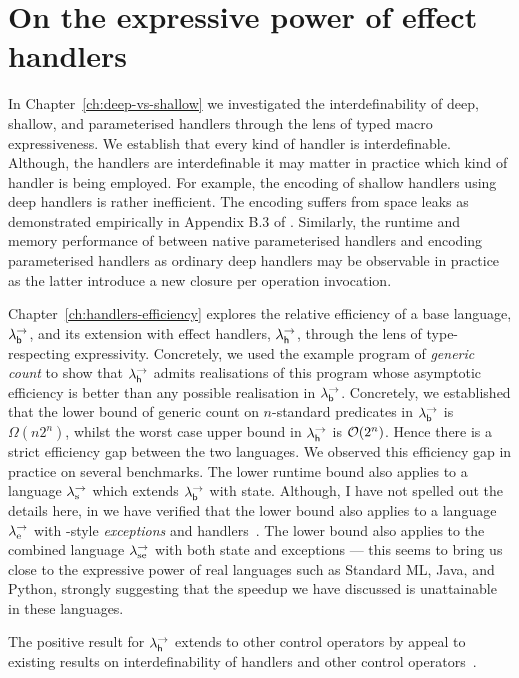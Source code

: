 \documentclass[12pt,phd,lfcs,twoside,openright,logo,leftchapter,normalheadings]{infthesis}
\theoremstyle{plain}
\theoremstyle{definition}
\begin{document}
\section{On the expressive power of effect handlers}

In Chapter~\ref{ch:deep-vs-shallow} we investigated the
interdefinability of deep, shallow, and parameterised handlers through
the lens of typed macro expressiveness. We establish that every kind
of handler is interdefinable. Although, the handlers are
interdefinable it may matter in practice which kind of handler is
being employed. For example, the encoding of shallow handlers using
deep handlers is rather inefficient. The encoding suffers from space
leaks as demonstrated empirically in Appendix B.3 of
\citet{HillerstromL18}. Similarly, the runtime and memory performance
of between native parameterised handlers and encoding parameterised
handlers as ordinary deep handlers may be observable in practice as
the latter introduce a new closure per operation invocation.

Chapter~\ref{ch:handlers-efficiency} explores the relative efficiency
of a base language, $\lambda^\rightarrow_{\mathsf{b}}$, and its extension with effect handlers,
$\lambda^\rightarrow_{\mathsf{h}}$, through the lens of type-respecting expressivity. Concretely,
we used the example program of \emph{generic count} to show that
$\lambda^\rightarrow_{\mathsf{h}}$ admits realisations of this program whose asymptotic
efficiency is better than any possible realisation in
$\lambda^\rightarrow_{\mathsf{b}}$. Concretely, we established that the lower bound of generic
count on $n$-standard predicates in $\lambda^\rightarrow_{\mathsf{b}}$ is $\Omega(n2^n)$, whilst
the worst case upper bound in $\lambda^\rightarrow_{\mathsf{h}}$ is $\mathcal{O}(2^n)$. Hence there is
a strict efficiency gap between the two languages. We observed this
efficiency gap in practice on several benchmarks.
%
The lower runtime bound also applies to a language $\lambda^\rightarrow_{\textrm{\normalfont s}}$ which
extends $\lambda^\rightarrow_{\mathsf{b}}$ with state.
%
Although, I have not spelled out the details here, in
\citet{HillerstromLL20} we have verified that the lower bound also
applies to a language $\lambda^\rightarrow_{\textrm{\normalfont e}}$ with \citeauthor{BentonK01}-style
\emph{exceptions} and handlers~\cite{BentonK01}.
%
The lower bound also applies to the combined language $\lambda^\rightarrow_{\textrm{\normalfont se}}$
with both state and exceptions --- this seems to bring us close to
the expressive power of real languages such as Standard ML, Java, and
Python, strongly suggesting that the speedup we have discussed is
unattainable in these languages.

The positive result for $\lambda^\rightarrow_{\mathsf{h}}$ extends to other control operators by
appeal to existing results on interdefinability of handlers and other
control operators~\cite{ForsterKLP19,PirogPS19}.
%
%
\end{document}

